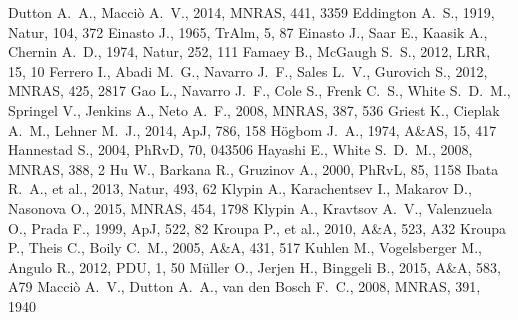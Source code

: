 \documentclass[paper=a4, fontsize=11pt]{scrartcl} %
\numberwithin{equation}{section} %
\numberwithin{figure}{section} %
\numberwithin{table}{section} %
\begin{document}
\begin{thebibliography}{}
 Dutton A.~A., Macci{\`o} A.~V., 2014, MNRAS, 441, 3359 
Eddington A.~S., 1919, Natur, 104, 372
Einasto J., 1965, TrAlm, 5, 87
 Einasto J., Saar E., Kaasik A., Chernin 
A.~D., 1974, Natur, 252, 111 
 Famaey B., McGaugh S.~S., 2012, LRR, 15, 10 
 Ferrero I., Abadi M.~G., Navarro J.~F., 
Sales L.~V., Gurovich S., 2012, MNRAS, 425, 2817
Gao L., Navarro J.~F., Cole S., Frenk C.~S., White S.~D.~M., Springel V., 
Jenkins A., Neto A.~F., 2008, MNRAS, 387, 536 
 Griest K., Cieplak A.~M., Lehner M.~J., 2014, ApJ, 786, 158
 H{\"o}gbom J.~A., 1974, A\&AS, 15, 417  
Hannestad S., 2004, PhRvD, 70, 043506 
 Hayashi E., White S.~D.~M., 2008, MNRAS, 388, 2 
 Hu W., Barkana R., Gruzinov A., 2000, PhRvL, 85, 1158 
Ibata R.~A., et al., 2013, Natur, 493, 62 
Klypin A., Karachentsev I., Makarov D., Nasonova O., 2015, MNRAS, 454, 1798 
Klypin A., Kravtsov A.~V., Valenzuela O., Prada F., 1999, ApJ, 522, 82 
 Kroupa P., et al., 2010, A\&A, 523, A32 
 Kroupa P., Theis C., Boily C.~M., 2005, A\&A, 431, 517 
 Kuhlen M., Vogelsberger M., Angulo R., 2012, PDU, 1, 50 
 M{\"u}ller O., Jerjen H., Binggeli B., 2015, A\&A, 583, A79 
 Macci{\`o} A.~V., Dutton A.~A., van den Bosch F.~C., 2008, MNRAS, 391, 1940 

\end{thebibliography}
\end{document}
